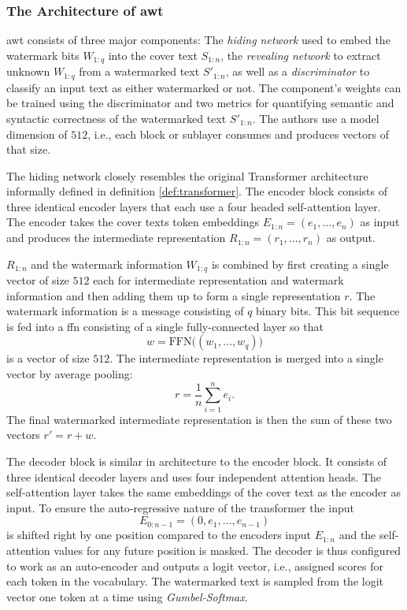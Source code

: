     \subsubsection{The Architecture of \acs{awt}}
    \ac{awt} consists of three major components: The \emph{hiding network} used to embed the watermark bits $W_{1:q}$ into the cover text $S_{1:n}$, the \emph{revealing network} to extract unknown $W_{1:q}$ from a watermarked text $S'_{1:n}$, as well as a \emph{discriminator} to classify an input text as either watermarked or not.
    The component's weights can be trained using the discriminator and two metrics for quantifying semantic and syntactic correctness of the watermarked text $S'_{1:n}$.
    The authors use a model dimension of $512$, i.e., each block or sublayer consumes and produces vectors of that size.

    The hiding network closely resembles the original Transformer architecture informally defined in definition \ref{def:transformer}.
    The encoder block consists of three identical encoder layers that each use a four headed self-attention layer.
    The encoder takes the cover texts token embeddings $E_{1:n} = (e_1, \dots, e_n)$ as input and produces the intermediate representation $R_{1:n} = (r_1, \dots, r_n)$ as output.

    $R_{1:n}$ and the watermark information $W_{1:q}$ is combined by first creating a single vector of size $512$ each for intermediate representation and watermark information and then adding them up to form a single representation $r$.
    The watermark information is a message consisting of $q$ binary bits.
    This bit sequence is fed into a \ac{ffn} consisting of a single fully-connected layer so that 
    \begin{equation}
        w = \mathrm{FFN}\big( (w_1, \dots, w_q) \big)
    \end{equation}
    is a vector of size $512$.
    The intermediate representation is merged into a single vector by average pooling:
    \begin{equation}
        r = \frac{1}{n} \sum_{i=1}^{n} e_i \text{.}
    \end{equation}
    The final watermarked intermediate representation is then the sum of these two vectors $r'=r+w$.

    The decoder block is similar in architecture to the encoder block.
    It consists of three identical decoder layers and uses four independent attention heads.
    The self-attention layer takes the same embeddings of the cover text as the encoder as input.
    To ensure the auto-regressive nature of the transformer the input
    \begin{equation}
        E_{0:n-1} = (0, e_1, \dots, e_{n-1})
    \end{equation}
    is shifted right by one position compared to the encoders input $E_{1:n}$ and the self-attention values for any future position is masked.
    The decoder is thus configured to work as an auto-encoder and outputs a logit vector, i.e., assigned scores for each token in the vocabulary.
    The watermarked text is sampled from the logit vector one token at a time using \emph{Gumbel-Softmax}.

